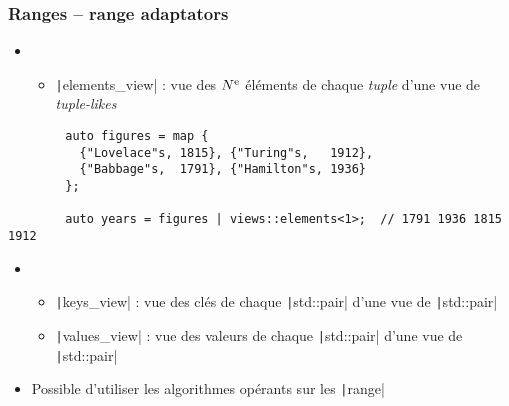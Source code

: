 \documentclass[C++.tex]{subfiles}
\begin{document}
\begin{frame}[fragile]
	\frametitle{Ranges -- range adaptators}
	\begin{itemize}
		\item [] \begin{itemize}
			\item \texttt|elements_view| : vue des $N\textsuperscript{e}$ éléments de chaque \textit{tuple} d'une vue de \textit{tuple-likes}
		\end{itemize}
	\end{itemize}

	\begin{verbatim}
		auto figures = map {
		  {"Lovelace"s, 1815}, {"Turing"s,   1912},
		  {"Babbage"s,  1791}, {"Hamilton"s, 1936}
		};

		auto years = figures | views::elements<1>;  // 1791 1936 1815 1912
	\end{verbatim}

	\begin{itemize}
		\item [] \begin{itemize}
			\item \texttt|keys_view| : vue des clés de chaque \texttt|std::pair| d'une vue de \texttt|std::pair|
			\item \texttt|values_view| : vue des valeurs de chaque \texttt|std::pair| d'une vue de \texttt|std::pair|
		\end{itemize}
	\item Possible d'utiliser les algorithmes opérants sur les \texttt|range|
	\end{itemize}
\end{frame}
\end{document}
